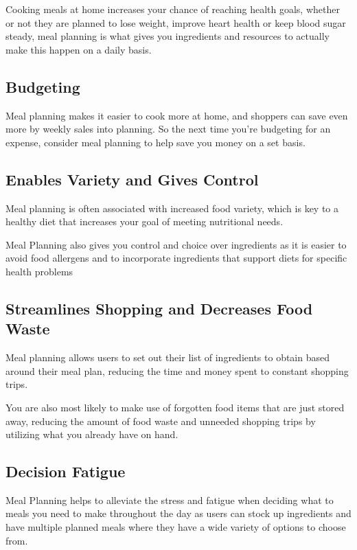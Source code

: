  Cooking meals at home increases your chance of reaching health goals, whether or not they are planned to lose weight, improve heart health or keep blood sugar steady, meal planning is what gives you ingredients and resources to actually make this happen on a daily basis.

\subsection{Budgeting}

Meal planning makes it easier to cook more at home, and shoppers can save even more by weekly sales into planning. So the next time you're budgeting for an expense, consider meal planning to help save you money on a set basis.

\subsection{Enables Variety and Gives Control}

Meal planning is often associated with increased food variety, which is key to  a healthy diet that increases your goal of meeting nutritional needs.

Meal Planning also gives you control and choice over ingredients as it is easier to avoid food allergens and to incorporate ingredients that support diets for specific health problems

\subsection{Streamlines Shopping and Decreases Food Waste}

Meal planning allows users to set out their list of ingredients to obtain based around their meal plan, reducing the time and money spent to constant shopping trips.

You are also most likely to make use of forgotten food items that are just stored away, reducing the amount of food waste and unneeded shopping trips by utilizing what you already have on hand.

\subsection{Decision Fatigue}

Meal Planning helps to alleviate the stress and fatigue when deciding what to meals you need to make throughout the day as users can stock up ingredients and have multiple planned meals where they have a wide variety of options to choose from.

